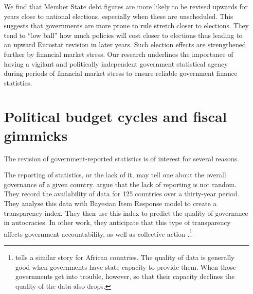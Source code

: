 \documentclass[]{article}
\begin{document}
We find that Member State debt figures are more likely to be revised upwards for years close to national elections, especially when these are unscheduled. This suggests that governments are more prone to rule stretch closer to elections. They tend to ``low ball'' how much policies will cost closer to elections thus leading to an upward Eurostat revision in later years. Such election effects are strengthened further by financial market stress. Our research underlines the importance of having a vigilant and politically independent government statistical agency during periods of financial market stress to ensure reliable government finance statistics.

\section{Political budget cycles and fiscal gimmicks}

The revision of government-reported statistics is of interest for several reasons.

The reporting of statistics, or the lack of it, may tell one about the overall governance of a given country. \cite{Hollyer2014} argue that the lack of reporting is not random. They record the availability of data for 125 countries over a thirty-year period. They analyse this data with Bayesian Item Response model to create a transparency index. They then use this index to predict the quality of governance in autocracies. In other work, they anticipate that this type of transparency affects government accountability, as well as collective action \citep{hollyerforthcoming}.\footnote{\cite{jervin2013} tells a similar story for African countries. The quality of data is generally good when governments have state capacity to provide them. When those governments get into trouble, however, so that their capacity declines the quality of the data also drops.}
\end{document}

